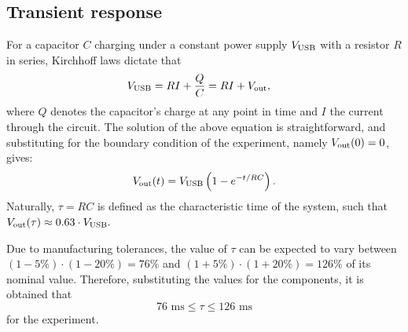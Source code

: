 \documentclass{article}
\begin{document}
\subsection{Transient response}
For a capacitor $C$ charging under a constant power supply $V_{\text{USB}}$ with a resistor $R$ in series, Kirchhoff laws dictate that
\begin{equation*}
    \begin{split}
        V_{\text{USB}} &= RI + \frac{Q}{C} = RI + V_{\text{out}},
    \end{split}
\end{equation*}
where $Q$ denotes the capacitor's charge at any point in time and $I$ the current through the circuit. The solution of the above equation is straightforward, and substituting for the boundary condition of the experiment, namely $V_{\text{out}}(0) = 0$, gives:
\begin{equation}
    V_{\text{out}}(t) = V_{\text{USB}}\left( 1 - e^{-t/RC}\right).
    \label{eqn:charge_ideal}
\end{equation}
Naturally, $\tau = RC$ is defined as the characteristic time of the system, such that $V_{\text{out}}(\tau) \approx 0.63 \cdot V_{\text{USB}}.$
\par Due to manufacturing tolerances, the value of $\tau$ can be expected to vary between $(1-5\%)\cdot(1-20\%) = 76\%$ and $(1+5\%)\cdot(1+20\%) = 126\%$ of its nominal value. Therefore, substituting the values for the components, it is obtained that
\begin{equation}
    76\text{ ms} \le \tau \le 126 \text { ms}
    \label{eqn:tau_boundary}
\end{equation}
for the experiment.
\end{document}
